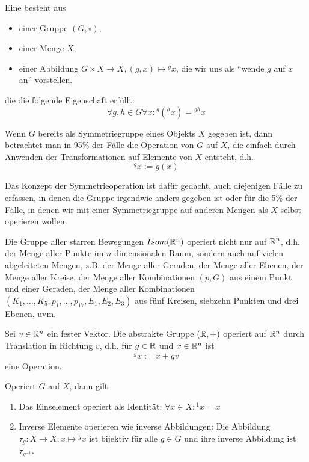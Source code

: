 \begin{definition}
Eine  besteht aus
\begin{itemize}
\item einer Gruppe $(G,\circ)$,
\item einer Menge $X$,
\item einer Abbildung $G\times X\to X, (g,x)\mapsto{^g x}$, die wir uns als \enquote{wende $g$ auf $x$ an} vorstellen.
\end{itemize}
die die folgende Eigenschaft erfüllt:
\[\forall g,h\in G \forall x: {^g(^h x)} = {^{gh}x}\]
\end{definition}

\begin{example}
Wenn $G$ bereits als Symmetriegruppe eines Objekts $X$ gegeben ist, dann betrachtet man in 95\% der Fälle die Operation von $G$ auf $X$, die einfach durch Anwenden der Transformationen auf Elemente von $X$ entsteht, d.h.
\[{^g x} := g(x)\]

Das Konzept der Symmetrieoperation ist dafür gedacht, auch diejenigen Fälle zu erfassen, in denen die Gruppe irgendwie anders gegeben ist oder für die 5\% der Fälle, in denen wir mit einer Symmetriegruppe auf anderen Mengen als $X$ selbst operieren wollen.
\end{example}

\begin{example}
Die Gruppe aller starren Bewegungen $Isom(\mathbb{R}^n)$ operiert nicht nur auf $\mathbb{R}^n$, d.h. der Menge aller Punkte im $n$-dimensionalen Raum, sondern auch auf vielen abgeleiteten Mengen, z.B. der Menge aller Geraden, der Menge aller Ebenen, der Menge aller Kreise, der Menge aller Kombinationen $(p,G)$ aus einem Punkt und einer Geraden, der Menge aller Kombinationen $(K_1,\ldots,K_5, p_1,\ldots,p_{17}, E_1,E_2,E_3)$ aus fünf Kreisen, siebzehn Punkten und drei Ebenen, uvm.
\end{example}

\begin{example}
Sei $v\in\mathbb{R}^n$ ein fester Vektor. Die abstrakte Gruppe $(\mathbb{R},+)$ operiert auf $\mathbb{R}^n$ durch Translation in Richtung $v$, d.h. für $g\in\mathbb{R}$ und $x\in\mathbb{R}^n$ ist
\[{^g x} := x+gv\]
eine Operation.
\end{example}

\begin{lemma}[Offensichtliches]
Operiert $G$ auf $X$, dann gilt:
\begin{enumerate}
\item Das Einselement operiert als Identität: $\forall x\in X: {^1 x} = x$
\item Inverse Elemente operieren wie inverse Abbildungen: Die Abbildung $\tau_g: X\to X, x\mapsto {^g x}$ ist bijektiv für alle $g\in G$ und ihre inverse Abbildung ist $\tau_{g^{-1}}$. 
\end{enumerate}
\end{lemma}

